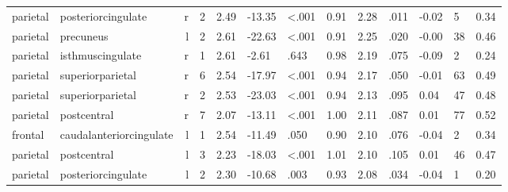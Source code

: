 \documentclass{article}
\begin{document}
\begin{longtable}{llrR{1.3cm}R{1cm}R{1.3cm}R{1cm}R{1cm}R{1.3cm}R{1cm}R{1.8cm}R{1.3cm}R{1.8cm}}
  parietal &        posteriorcingulate &    r &         2 &                  2.49 &           -13.35 &      \textless.001 &                               0.91 &                          2.28 &                            .011 &  -0.02 &      5 &      0.34 \\
  parietal &                 precuneus &    l &         2 &                  2.61 &           -22.63 &      \textless.001 &                               0.91 &                          2.25 &                            .020 &  -0.00 &     38 &      0.46 \\
  parietal &          isthmuscingulate &    r &         1 &                  2.61 &            -2.61 &               .643 &                               0.98 &                          2.19 &                            .075 &  -0.09 &      2 &      0.24 \\
  parietal &          superiorparietal &    r &         6 &                  2.54 &           -17.97 &      \textless.001 &                               0.94 &                          2.17 &                            .050 &  -0.01 &     63 &      0.49 \\
  parietal &          superiorparietal &    r &         2 &                  2.53 &           -23.03 &      \textless.001 &                               0.94 &                          2.13 &                            .095 &   0.04 &     47 &      0.48 \\
  parietal &               postcentral &    r &         7 &                  2.07 &           -13.11 &      \textless.001 &                               1.00 &                          2.11 &                            .087 &   0.01 &     77 &      0.52 \\
   frontal &   caudalanteriorcingulate &    l &         1 &                  2.54 &           -11.49 &               .050 &                               0.90 &                          2.10 &                            .076 &  -0.04 &      2 &      0.34 \\
  parietal &               postcentral &    l &         3 &                  2.23 &           -18.03 &      \textless.001 &                               1.01 &                          2.10 &                            .105 &   0.01 &     46 &      0.47 \\
  parietal &        posteriorcingulate &    l &         2 &                  2.30 &           -10.68 &               .003 &                               0.93 &                          2.08 &                            .034 &  -0.04 &      1 &      0.20 \\

\end{longtable}
\end{document}
